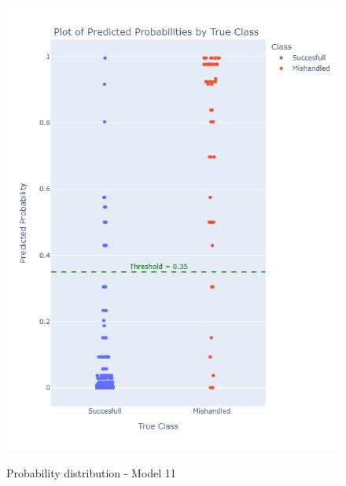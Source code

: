 \documentclass[12pt]{article}
\begin{document}
\begin{figure}
\begin{minipage}[c]{0.4\linewidth}
    \includegraphics[width=1\textwidth]{Probability_distribution_Model 11.png}\\
    \caption{Probability distribution - Model 11}
\end{minipage}
\hfill
\begin{minipage}[c]{0.4\linewidth}
\end{minipage}%
\end{figure}
\FloatBarrier
\end{document}
